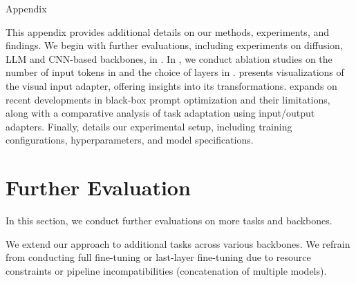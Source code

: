 {\huge Appendix}

This appendix provides additional details on our methods, experiments, and findings. We begin with further evaluations, including experiments on diffusion, LLM and CNN-based backbones, in . In , we conduct ablation studies on the number of input tokens in \ours and the choice of layers in \oursp.  presents visualizations of the visual input adapter, offering insights into its transformations.  expands on recent developments in black-box prompt optimization and their limitations, along with a comparative analysis of task adaptation using input/output adapters. Finally,  details our experimental setup, including training configurations, hyperparameters, and model specifications.



\section{Further Evaluation}
\label{sec:further_eval}
In this section, we conduct further evaluations on more tasks and backbones.

We extend our \oursp approach to additional tasks across various backbones. We refrain from conducting full fine-tuning or last-layer fine-tuning due to resource constraints or pipeline incompatibilities (\eg concatenation of multiple models).


